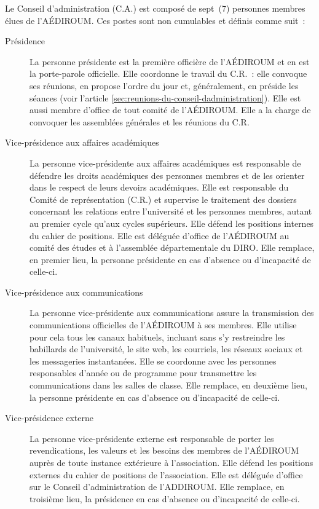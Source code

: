 \documentclass{aediroum}
\newcommand{\article}[1]{article \ref{#1}}
\begin{document}
Le Conseil d'administration (C.A.) est composé de sept~(7) personnes membres élues de l'AÉDIROUM. Ces postes sont non cumulables et définis comme suit~:
\begin{description}
\item[Présidence] La personne présidente est la première officière de l'AÉDIROUM et en est la porte-parole officielle. Elle coordonne le travail du C.R.~: elle convoque ses réunions, en propose l'ordre du jour et, généralement, en préside les séances (voir l'\article{sec:reunions-du-conseil-dadministration}). Elle est aussi membre d'office de tout comité de l'AÉDIROUM. Elle a la charge de convoquer les assemblées générales et les réunions du C.R.
\item[Vice-présidence aux affaires académiques] La personne vice-présidente aux affaires académiques est responsable de défendre les
droits académiques des personnes membres et de les orienter dans le respect de leurs
devoirs académiques. Elle est responsable du Comité de représentation (C.R.) et supervise
le traitement des dossiers concernant les relations entre l’université et les personnes
membres, autant au premier cycle qu’aux cycles supérieurs. Elle défend les positions internes du cahier de positions. Elle est déléguée d’office de l’AÉDIROUM au comité des
études et à l’assemblée départementale du DIRO. Elle remplace, en premier lieu, la personne
présidente en cas d’absence ou d’incapacité de celle-ci.
\item[Vice-présidence aux communications] La personne vice-présidente aux communications assure la transmission des communications
officielles de l’AÉDIROUM à ses membres. Elle utilise pour cela tous les canaux
habituels, incluant sans s’y restreindre les babillards de l’université, le site web, les
courriels, les réseaux sociaux et les messageries instantanées. Elle se coordonne avec les
personnes responsables d’année ou de programme pour transmettre les communications
dans les salles de classe. Elle remplace, en deuxième lieu, la personne présidente en cas
d’absence ou d’incapacité de celle-ci.
\item[Vice-présidence externe] La personne vice-présidente externe est responsable de porter les revendications, les valeurs et les besoins des membres de l’AÉDIROUM auprès de toute instance extérieure
à l’association. Elle défend les positions externes du cahier de positions de l’association. Elle est déléguée d’office sur le Conseil d’administration de l’ADDIROUM. Elle remplace, en troisième lieu, la présidence en cas d’absence ou d’incapacité de celle-ci.

\end{description}
\end{document}
